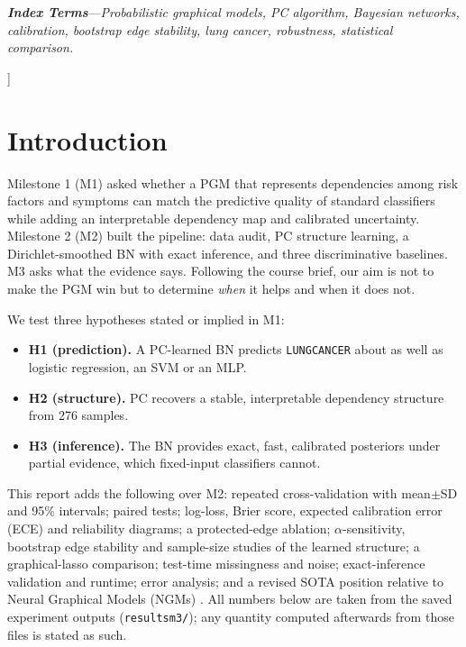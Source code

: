 \documentclass[10pt,twocolumn,letterpaper]{article}
\renewcommand{\_}{\textunderscore\hspace{0pt}}
\newcommand{\V}[1]{{\texttt{\footnotesize #1}}}
\begin{document}
{\begin{center}
\begin{minipage}{6.95in}
\par\medskip
\textit{\bfseries Index Terms}---\textit{Probabilistic graphical models, PC algorithm, Bayesian networks, calibration, bootstrap edge stability, lung cancer, robustness, statistical comparison.}
\end{minipage}
\end{center}
\vspace{8pt}
}]

\section{Introduction}
Milestone 1 (M1) asked whether a PGM that represents dependencies among risk factors and symptoms can match the predictive quality of standard classifiers while adding an interpretable dependency map and calibrated uncertainty. Milestone 2 (M2) built the pipeline: data audit, PC structure learning, a Dirichlet-smoothed BN with exact inference, and three discriminative baselines. M3 asks what the evidence says. Following the course brief, our aim is not to make the PGM win but to determine \emph{when} it helps and when it does not.

We test three hypotheses stated or implied in M1:
\begin{itemize}
\item \textbf{H1 (prediction).} A PC-learned BN predicts \V{LUNG\_CANCER} about as well as logistic regression, an SVM or an MLP.
\item \textbf{H2 (structure).} PC recovers a stable, interpretable dependency structure from 276 samples.
\item \textbf{H3 (inference).} The BN provides exact, fast, calibrated posteriors under partial evidence, which fixed-input classifiers cannot.
\end{itemize}
This report adds the following over M2: repeated cross-validation with mean$\pm$SD and 95\% intervals; paired tests; log-loss, Brier score, expected calibration error (ECE) and reliability diagrams; a protected-edge ablation; $\alpha$-sensitivity, bootstrap edge stability and sample-size studies of the learned structure; a graphical-lasso comparison; test-time missingness and noise; exact-inference validation and runtime; error analysis; and a revised SOTA position relative to Neural Graphical Models (NGMs) \cite{ngm}. All numbers below are taken from the saved experiment outputs (\texttt{results\_m3/}); any quantity computed afterwards from those files is stated as such.
\end{document}
